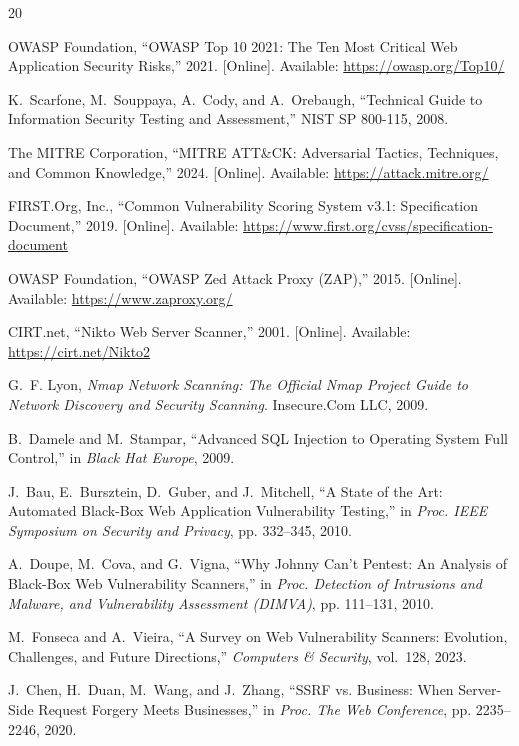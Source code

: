\documentclass[conference]{IEEEtran}
\begin{document}
\begin{thebibliography}{20}

OWASP Foundation, ``OWASP Top 10 2021: The Ten Most Critical Web Application Security Risks,'' 2021. [Online]. Available: \url{https://owasp.org/Top10/}

K.~Scarfone, M.~Souppaya, A.~Cody, and A.~Orebaugh, ``Technical Guide to Information Security Testing and Assessment,'' NIST SP 800-115, 2008.

The MITRE Corporation, ``MITRE ATT\&CK: Adversarial Tactics, Techniques, and Common Knowledge,'' 2024. [Online]. Available: \url{https://attack.mitre.org/}

FIRST.Org, Inc., ``Common Vulnerability Scoring System v3.1: Specification Document,'' 2019. [Online]. Available: \url{https://www.first.org/cvss/specification-document}

OWASP Foundation, ``OWASP Zed Attack Proxy (ZAP),'' 2015. [Online]. Available: \url{https://www.zaproxy.org/}

CIRT.net, ``Nikto Web Server Scanner,'' 2001. [Online]. Available: \url{https://cirt.net/Nikto2}

G.~F. Lyon, \textit{Nmap Network Scanning: The Official Nmap Project Guide to Network Discovery and Security Scanning}. Insecure.Com LLC, 2009.

B.~Damele and M.~Stampar, ``Advanced SQL Injection to Operating System Full Control,'' in \textit{Black Hat Europe}, 2009.

J.~Bau, E.~Bursztein, D.~Guber, and J.~Mitchell, ``A State of the Art: Automated Black-Box Web Application Vulnerability Testing,'' in \textit{Proc. IEEE Symposium on Security and Privacy}, pp. 332--345, 2010.

A.~Doupe, M.~Cova, and G.~Vigna, ``Why Johnny Can't Pentest: An Analysis of Black-Box Web Vulnerability Scanners,'' in \textit{Proc. Detection of Intrusions and Malware, and Vulnerability Assessment (DIMVA)}, pp. 111--131, 2010.

M.~Fonseca and A.~Vieira, ``A Survey on Web Vulnerability Scanners: Evolution, Challenges, and Future Directions,'' \textit{Computers \& Security}, vol.~128, 2023.

J.~Chen, H.~Duan, M.~Wang, and J.~Zhang, ``SSRF vs. Business: When Server-Side Request Forgery Meets Businesses,'' in \textit{Proc. The Web Conference}, pp. 2235--2246, 2020.


\end{thebibliography}
\end{document}
